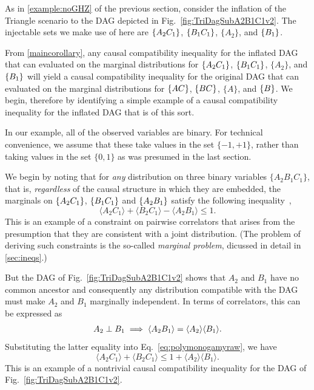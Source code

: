 \smallskip\nobreak

As in \cref{example:noGHZ} of the previous section, consider the inflation of the Triangle scenario to the DAG depicted in Fig.~\ref{fig:TriDagSubA2B1C1v2}.  
The injectable sets we make use of here are $\left\lbrace A_2 C_1\right\rbrace$, $\left\lbrace B_1 C_1\right\rbrace$, $\{ A_2\}$, and  $\left\lbrace B_1\right\rbrace$.

From \cref{maincorollary}, any causal compatibility inequality for the inflated DAG that can evaluated on the marginal distributions for $\left\lbrace A_2 C_1\right\rbrace$, $\left\lbrace B_1 C_1\right\rbrace$, $\{ A_2\}$, and  $\left\lbrace B_1\right\rbrace$ will yield a causal compatibility inequality for the original DAG that can evaluated on the marginal distributions for $\left\lbrace A C\right\rbrace$, $\left\lbrace B C\right\rbrace$, $\{ A\}$, and  $\left\lbrace B\right\rbrace$.
We begin, therefore by identifying a simple example of a causal compatibility inequality for the inflated DAG that is of this sort. 
 
In our example, all of the observed variables are binary. For technical convenience, we assume that these take values in the set $\{-1,+1\}$, rather than taking values in the set $\{0,1\}$ as was presumed in the last section. 

We begin by noting that for {\em any} distribution on three binary variables $\{A_2 B_1 C_1\}$, that is, {\em regardless} of the causal structure in which they are embedded, the marginals on $\left\lbrace A_2 C_1\right\rbrace$, $\left\lbrace B_1 C_1\right\rbrace$ and $\left\lbrace A_2 B_1\right\rbrace$ satisfy the following inequality~\cite{pitowsky_boole_1994,Pitowsky1989,kellerer_marginal_1964,leggett_garg_1985,araujo_cycle_2013},
\begin{equation}
	\label{eq:polymonogamyraw}
	\langle A_2 C_1\rangle + \langle B_2 C_1 \rangle - \langle A_2 B_1 \rangle \leq 1.
\end{equation}
This is an example of a constraint on pairwise correlators that arises from the presumption that they are consistent with a joint distribution. (The problem of deriving such constraints is the so-called {\em marginal problem}, dicussed in detail in \cref{sec:ineqs}.)

But the DAG of Fig.~\ref{fig:TriDagSubA2B1C1v2} shows that $A_2$ and $B_1$ have no common ancestor and consequently any distribution compatible with the DAG must make $A_2$ and $B_1$ marginally independent.  In terms of correlators, this can be expressed as 
\begin{align}\label{corrfact}
A_2 \perp B_1 \implies  \langle A_2 B_1 \rangle =  \langle A_2\rangle \langle B_1 \rangle.
\end{align}
Substituting the latter equality into Eq.~\eqref{eq:polymonogamyraw}, we have
\begin{equation}
	\langle A_2 C_1\rangle + \langle B_2 C_1 \rangle   \leq 1 + \langle A_2 \rangle \langle B_1\rangle.
\end{equation}
This is an example of a nontrivial causal compatibility inequality for the DAG of Fig.~\ref{fig:TriDagSubA2B1C1v2}.  

